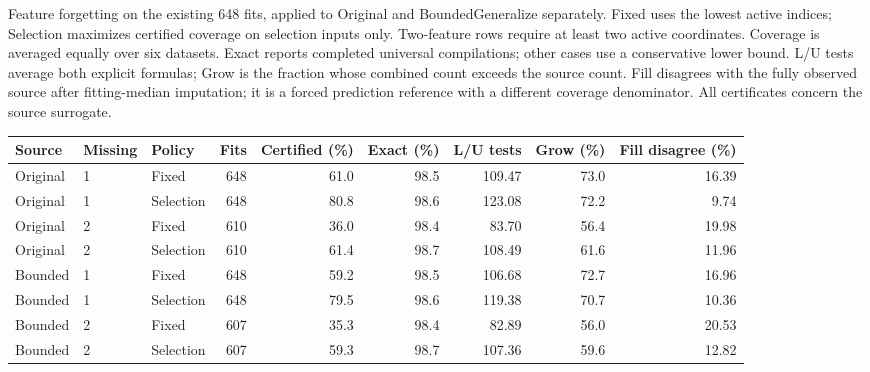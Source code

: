 \begin{kbtable}
\centering
\caption{Feature forgetting on the existing 648 fits, applied to Original and BoundedGeneralize separately. Fixed uses the lowest active indices; Selection maximizes certified coverage on selection inputs only. Two-feature rows require at least two active coordinates. Coverage is averaged equally over six datasets. Exact reports completed universal compilations; other cases use a conservative lower bound. L/U tests average both explicit formulas; Grow is the fraction whose combined count exceeds the source count. Fill disagrees with the fully observed source after fitting-median imputation; it is a forced prediction reference with a different coverage denominator. All certificates concern the source surrogate.}
\label{tab:feature-forgetting}
\small
\begin{adjustbox}{max width=\linewidth}
\begin{tabular}{lllrrrrrr}
\toprule
Source & Missing & Policy & Fits & Certified (\%) & Exact (\%) & L/U tests & Grow (\%) & Fill disagree (\%) \\
\midrule
Original & 1 & Fixed & 648 & 61.0 & 98.5 & 109.47 & 73.0 & 16.39 \\
Original & 1 & Selection & 648 & 80.8 & 98.6 & 123.08 & 72.2 & 9.74 \\
Original & 2 & Fixed & 610 & 36.0 & 98.4 & 83.70 & 56.4 & 19.98 \\
Original & 2 & Selection & 610 & 61.4 & 98.7 & 108.49 & 61.6 & 11.96 \\
Bounded & 1 & Fixed & 648 & 59.2 & 98.5 & 106.68 & 72.7 & 16.96 \\
Bounded & 1 & Selection & 648 & 79.5 & 98.6 & 119.38 & 70.7 & 10.36 \\
Bounded & 2 & Fixed & 607 & 35.3 & 98.4 & 82.89 & 56.0 & 20.53 \\
Bounded & 2 & Selection & 607 & 59.3 & 98.7 & 107.36 & 59.6 & 12.82 \\
\bottomrule
\end{tabular}
\end{adjustbox}
\end{kbtable}
